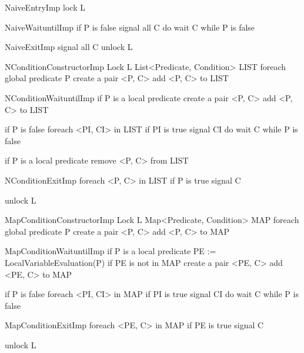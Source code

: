 \documentclass[preprint]{sigplanconf}
\begin{document}
\begin{SaveVerbatim}{NaiveEntryImp}
lock L 
\end{SaveVerbatim}

\begin{SaveVerbatim}{NaiveWaituntilImp}
if P is false
  signal all C
  do 
    wait C
  while P is false
\end{SaveVerbatim}

\begin{SaveVerbatim}{NaiveExitImp}
signal all C
unlock L
\end{SaveVerbatim}

\begin{SaveVerbatim}{NConditionConstructorImp}
Lock L
List<Predicate, Condition> LIST
foreach global predicate P
  create a pair <P, C>
  add <P, C> to LIST
\end{SaveVerbatim}

\begin{SaveVerbatim}{NConditionWaituntilImp}
if P is a local predicate 
  create a pair <P, C>
  add <P, C> to LIST
 
if P is false 
  foreach <PI, CI> in LIST
    if PI is true
      signal CI
  do 
    wait C
  while P is false

if P is a local predicate 
  remove <P, C> from LIST
\end{SaveVerbatim}

\begin{SaveVerbatim}{NConditionExitImp}
foreach <P, C> in LIST
  if P is true
    signal C

unlock L
\end{SaveVerbatim}


\begin{SaveVerbatim}{MapConditionConstructorImp}
Lock L
Map<Predicate, Condition> MAP
foreach global predicate P
  create a pair <P, C>
  add <P, C> to MAP 
\end{SaveVerbatim}

\begin{SaveVerbatim}{MapConditionWaituntilImp}
if P is a local predicate 
  PE := LocalVariableEvaluation(P)
  if PE is not in MAP
    create a pair <PE, C>
    add <PE, C> to MAP
 
if P is false 
  foreach <PI, CI> in MAP
    if PI is true
      signal CI
  do 
    wait C
  while P is false
\end{SaveVerbatim}

\begin{SaveVerbatim}{MapConditionExitImp}
foreach <PE, C> in MAP
  if PE is true
    signal C

unlock L
\end{SaveVerbatim}
\end{document}

